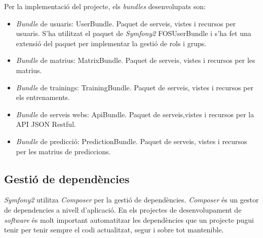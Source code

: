 Per la implementació del projecte, els \textit{bundles} desenvolupats son:
\begin{itemize}
\item \textit{Bundle} de usuaris: UserBundle. Paquet de serveis, vistes i recursos per usuaris. S'ha utilitzat el paquet de \textit{Symfony2} FOSUserBundle \cite{fosuserbundle} i s'ha fet una extensi\'{o} del paquet per implementar la gesti\'{o} de rols i grups. 
\item \textit{Bundle} de matrius: MatrixBundle. Paquet de serveis, vistes i recursos per les matrius.
\item \textit{Bundle} de trainings: TrainingBundle. Paquet de serveis, vistes i recursos per els entrenaments.
\item \textit{Bundle} de serveis webs: ApiBundle. Paquet de serveis,vistes i recursos per la API JSON Restful. 
\item \textit{Bundle} de predicci\'{o}: PredictionBundle. Paquet de serveis, vistes i recursos per les matrius de prediccions.
\end{itemize}

\subsection{Gesti\'{o} de depend\`{e}ncies} 
\label{subsec:dependencies}
\textit{Symfony2} utilitza \textit{Composer} per la gesti\'{o} de depend\`{e}ncies.\cite{composer} \textit{Composer} \'{e}s un gestor de dependencies a nivell d'aplicaci\'{o}. En els projectes de desenvolupament de \textit{software} \'{e}s molt important automatitzar les dependències que un projecte pugui tenir per tenir sempre el codi actualitzat, segur i sobre tot mantenible.\\

